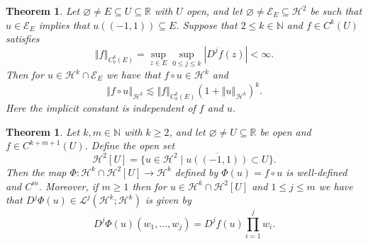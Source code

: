 \documentclass[10pt,a4paper]{amsart}
\theoremstyle{plain}
\newtheorem{thm}[lem]{Theorem}
\theoremstyle{definition}
\theoremstyle{remark}
\def\L{\mathcal{L}}
\def\N{\mathbb{N}}
\def\R{\mathbb{R}}
\def\h{\mathcal{H}}
\def\ls{\lesssim}
\def\st{\;\vert\;}
\providecommand{\abs}[1]{\left\vert#1\right\vert}
\providecommand{\norm}[1]{\left\Vert#1\right\Vert}
\begin{document}
\begin{thm}\label{hk_composition}
Let $\varnothing \neq E \subseteq U \subseteq \R$ with $U$ open, and let $\varnothing \neq \mathcal{E}_E \subseteq \h^2$ be such that $u \in \mathcal{E}_E$ implies that $u((-1,1)) \subseteq E$.  Suppose that $2 \le k\in \N$ and $f \in C^k(U)$ satisfies 
\begin{equation}
 \norm{f}_{C^k_b(E)} = \sup_{z \in E} \sup_{0 \le j \le k} \abs{D^j f(z)} < \infty.
\end{equation}
Then for  $u \in \h^k \cap \mathcal{E}_E$ we have that $f \circ u \in \h^k$ and 
\begin{equation}
 \norm{f\circ u}_{\h^k} \ls \norm{f}_{C^k_b(E)}  (1+\norm{u}_{\h^k})^k.
\end{equation}
Here the implicit constant is independent of $f$ and $u$.
\end{thm}

\begin{thm}\label{hk_comp_Cm}
Let $k,m \in \N$ with $k \ge 2$, and let $\varnothing \neq U \subseteq \R$ be open and $f \in C^{k+m+1}(U)$.  Define the open set 
\begin{equation}
 \h^2[U] = \{u \in \h^2 \st \overline{u((-1,1))} \subset U \}.
\end{equation}
Then the map $\Phi : \h^k \cap \h^2[U] \to \h^k$ defined by $\Phi(u) = f\circ u$ is well-defined and $C^m$.  Moreover, if $m \ge 1$ then for $u \in \h^k \cap \h^2[U]$ and $1 \le j \le m$ we have that $D^j \Phi(u) \in \L^j(\h^k;\h^k)$ is given by  
\begin{equation}\label{hk_comp_Cm_0}
 D^j\Phi(u) (w_1, \dotsc, w_j)  = D^j f(u) \prod_{i=1}^j w_i.
\end{equation}
\end{thm}
\end{document}
